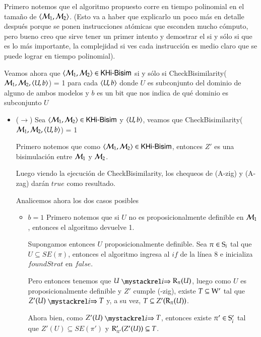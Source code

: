 \begin{demostracion}
    Primero notemos que el algoritmo propuesto corre en tiempo polinomial en el tamaño de $\tup{\modults_1,\modults_2}$.
    (Esto va a haber que explicarlo un poco más en detalle después porque se ponen instrucciones atómicas que esconden mucho cómputo, pero bueno creo que sirve tener un primer intento y demostrar el si y sólo si que es lo más importante, la complejidad si ves cada instrucción es medio claro que se puede lograr en tiempo polinomial).

    Veamos ahora que $\tup{\modults_1,\modults_2} \in \KHiBisim$ si y sólo si
    CheckBisimilarity($\modults_1,\modults_2,\tup{U,b}$) = 1 para cada $\tup{U,b}$ donde $U$ es subconjunto del dominio de alguno de ambos modelos y $b$ es un bit que nos indica de qué dominio es subconjunto $U$

    \begin{itemize}
        \item ($\rightarrow$)
        Sea $\tup{\modults_1,\modults_2} \in \KHiBisim$ y $\tup{U,b}$, veamos que CheckBisimilarity($\modults_1,\modults_2,\tup{U,b}$) = 1

        Primero notemos que como $\tup{\modults_1,\modults_2} \in \KHiBisim$, entonces $Z'$ es una bisimulación entre $\modults_1$ y $\modults_2$.

        Luego viendo la ejecución de CheckBisimilarity, los chequeos de (A-zig) y (A-zag) darán $true$ como resultado.
        
        Analicemos ahora los dos casos posibles

        \begin{itemize}
            \item $b = 1$
                Primero notemos que si $U$ no es proposicionalmente definible en $\modults_1$, entonces el algoritmo devuelve 1.

                Supongamos entonces $U$ proposicionalmente definible. Sea $\pi \in \S_i$ tal que $U \subseteq SE(\pi)$, entonces el algoritmo ingresa al $if$ de la línea 8 e inicializa $foundStrat$ en $false$.
                
                Pero entonces tenemos que $U \ultsExecAgi \R_\pi(U)$, luego como $U$ es proposicionalmente definible y $Z'$ cumple (\KHilogic-zig), existe $T \subseteq \W'$ tal que $Z'(U) \ultsExecAgi T$ y,
                a su vez, $T \subseteq Z'(\R_\pi(U))$.
                
                Ahora bien, como $Z'(U) \ultsExecAgi T$, entonces existe $\pi' \in \S_i'$ tal que $Z'(U) \subseteq SE(\pi')$ y $\R'_{\pi'}(Z'(U)) \subseteq T$.
                

\end{itemize}
\end{itemize}
\end{demostracion}
